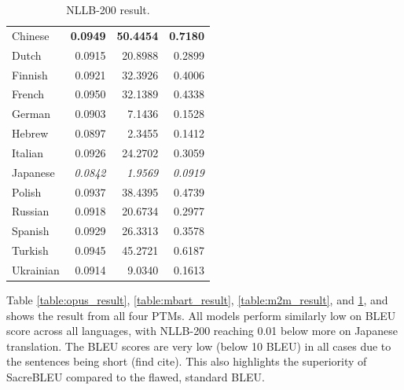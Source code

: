 \documentclass[a4paper]{article}
\begin{document}
\begin{table}[htbp]
\begin{minipage}{0.49\linewidth}
\begin{tabular}{|l|r|r|r|}
            \hline
            Chinese           & \textbf{0.0949} & \textbf{50.4454}   & \textbf{0.7180} \\
            Dutch             & 0.0915          & 20.8988            & 0.2899          \\
            Finnish           & 0.0921          & 32.3926            & 0.4006          \\
            French            & 0.0950          & 32.1389            & 0.4338          \\
            German            & 0.0903          & 7.1436             & 0.1528          \\
            Hebrew            & 0.0897          & 2.3455             & 0.1412          \\
            Italian           & 0.0926          & 24.2702            & 0.3059          \\
            Japanese          & \textit{0.0842} & \textit{1.9569}    & \textit{0.0919} \\
            Polish            & 0.0937          & 38.4395            & 0.4739          \\
            Russian           & 0.0918          & 20.6734            & 0.2977          \\
            Spanish           & 0.0929          & 26.3313            & 0.3578          \\
            Turkish           & 0.0945          & 45.2721            & 0.6187          \\
            Ukrainian         & 0.0914          & 9.0340             & 0.1613          \\
            \hline
        \end{tabular}
        \caption{NLLB-200 result.}
        \label{table:nllb_result}
    \end{minipage}
\end{table}

Table \ref{table:opus_result}, \ref{table:mbart_result}, \ref{table:m2m_result}, and \ref{table:nllb_result}, and  shows the result from all four PTMs. All models perform similarly low on BLEU score across all languages, with NLLB-200 reaching 0.01 below more on Japanese translation. The BLEU scores are very low (below 10 BLEU) in all cases due to the sentences being short (find cite). This also highlights the superiority of SacreBLEU compared to the flawed, standard BLEU.

\end{document}
